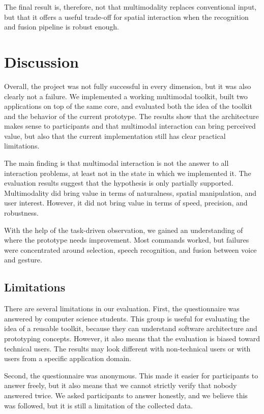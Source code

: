 \documentclass[sigconf]{acmart}
\begin{document}
The final result is, therefore,
not that multimodality replaces conventional input, but that it offers a useful
trade-off for spatial interaction when the recognition and fusion pipeline is
robust enough.

\section{Discussion}
Overall, the project was not fully successful in every dimension, but it was
also clearly not a failure. We implemented a working multimodal toolkit, built
two applications on top of the same core, and evaluated both the idea of the
toolkit and the behavior of the current prototype. The results show that the
architecture makes sense to participants and that multimodal interaction can
bring perceived value, but also that the current implementation still has clear
practical limitations.

The main finding is that multimodal interaction is not the answer to all
interaction problems, at least not in the state in which we implemented it. The
evaluation results suggest that the hypothesis is only partially supported. Multimodality did
bring value in terms of naturalness, spatial manipulation, and user interest.
However, it did not bring value in terms of speed, precision, and robustness.

With the help of the task-driven observation, we gained an understanding of where the prototype needs
improvement. Most commands worked, but failures were concentrated around
selection, speech recognition, and fusion between voice and gesture.

\subsection{Limitations}
There are several limitations in our evaluation. First, the questionnaire was
answered by computer science students. This group is useful for evaluating the
idea of a reusable toolkit, because they can understand software architecture
and prototyping concepts. However, it also means that the evaluation is biased
toward technical users. The results may look different with non-technical users
or with users from a specific application domain.

Second, the questionnaire was anonymous. This made it easier for participants to
answer freely, but it also means that we cannot strictly verify that nobody
answered twice. We asked participants to answer honestly, and we believe this was
followed, but it is still a limitation of the collected data.
\end{document}

